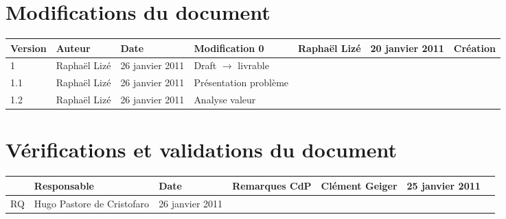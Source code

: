 
\section*{Modifications du document}

\begin{center}
\begin{longtable}{|m{14mm}||m{36mm}|m{36mm}|m{60mm}|}
\hline
Version & Auteur & Date & Modification\endhead \hline
0
& %
Raphaël Lizé
& %
20 janvier 2011
& %
Création
\\\hline
1
& %
Raphaël Lizé
& %
26 janvier 2011
& %
Draft $\rightarrow$ livrable
\\\hline
1.1
& %
Raphaël Lizé
& %
26 janvier 2011
& %
Présentation problème
\\\hline
1.2
& %
Raphaël Lizé
& %
26 janvier 2011
& %
Analyse valeur
\\\hline
\end{longtable}
\end{center}


\section*{Vérifications et validations du document}

\begin{center}
\begin{longtable}{|m{15mm}|m{36mm}|m{36mm}|m{60mm}|}
\hline
 & Responsable & Date & Remarques\endhead \hline
CdP
& %
Clément Geiger
& %
25 janvier 2011
& %

\\\hline
RQ
& %
Hugo Pastore de Cristofaro
& %
26 janvier 2011
& %

\\\hline
\end{longtable}
\end{center}

\pagebreak
